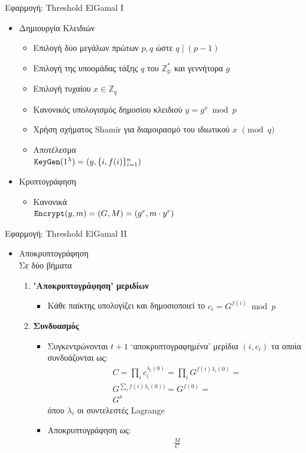 \documentclass[handout]{beamer}
\begin{document}
\begin{frame}{Εφαρμογή: Threshold ElGamal I}
\begin{itemize}
\item Δημιουργία Κλειδιών
\begin{itemize}
\item Επιλογή δύο μεγάλων πρώτων $p,q$ ώστε $q \mid (p-1)$  
\item Επιλογή της υποομάδας τάξης $q$ του $\mathbb{Z_p^*}$ και γεννήτορα $g$
\item Επιλογή τυχαίου $x \in \mathbb{Z}_q$
\item Κανονικός υπολογισμός δημοσίου κλειδιού $y = g^x \bmod{p}$

\item Χρήση σχήματος Shamir για διαμοιρασμό του ιδιωτικού $x$ $\pmod{q}$
\item Αποτέλεσμα \\ $\mathtt{KeyGen}(1^\lambda)=(y, \{ i, f(i) \}_{i=1}^n)$
\end{itemize}
\pause
\item Κρυπτογράφηση
\begin{itemize}
\item Κανονικά \\ $\mathtt{Encrypt}(y,m) = (G,M) = (g^r, m \cdot y^r)$
\end{itemize}
\end{itemize}
\end{frame}

\begin{frame}{Εφαρμογή: Threshold ElGamal II}
\begin{itemize}
\item Αποκρυπτογράφηση \\
Σε δύο βήματα

\begin{enumerate}
\item \textbf{'Αποκρυπτογράφηση' μεριδίων}
\begin{itemize}
\item Κάθε παίκτης υπολογίζει και δημοσιοποιεί το $c_i=G^{f(i)} \bmod p$
\end{itemize}
\item \textbf{Συνδυασμός}
\begin{itemize}
\item Συγκεντρώνονται $t+1$ `αποκρυπτογραφημένα' μερίδια $(i,c_i)$ τα οποία συνδυάζονται ως: \pause
\begin{align*}
C = \prod_i c_i ^ {\lambda_i(0)} = \prod_i G ^ {f(i) \lambda_i(0)} = \\
G ^ {\sum_i f(i) \lambda_i(0))} = G^{f(0)} = \\ G^x
\end{align*}
όπου $\lambda_i$ οι συντελεστές Lagrange \pause
\item Αποκρυπτογράφηση ως: \begin{align*}\frac{M}{C}\end{align*}
\end{itemize}
\end{enumerate}
\end{itemize}
\end{frame}
\end{document}
